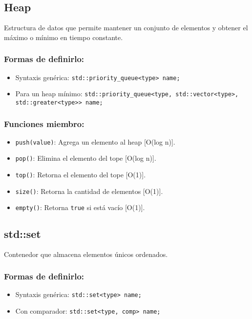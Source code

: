 \subsection{Heap}
\label{subsec:heap}
Estructura de datos que permite mantener un conjunto de elementos y obtener el máximo o mínimo en tiempo constante. 

\subsubsection*{Formas de definirlo:}
\begin{itemize}
  \item Syntaxis genérica: \texttt{std::priority\_queue<type> name;}
  \item Para un heap mínimo: \texttt{std::priority\_queue<type, std::vector<type>, std::greater<type>> name;}
\end{itemize}

\subsubsection*{Funciones miembro:}
\begin{itemize}
  \item \texttt{push(value)}: Agrega un elemento al heap [O(log n)].
  \item \texttt{pop()}: Elimina el elemento del tope [O(log n)].
  \item \texttt{top()}: Retorna el elemento del tope [O(1)].
  \item \texttt{size()}: Retorna la cantidad de elementos [O(1)].
  \item \texttt{empty()}: Retorna \texttt{true} si está vacío [O(1)]. 
\end{itemize}


\subsection{std::set}
\label{subsec:std_set}
Contenedor que almacena elementos únicos ordenados. 

\subsubsection*{Formas de definirlo:}
\begin{itemize}
  \item Syntaxis genérica: \texttt{std::set<type> name;}
  \item Con comparador: \texttt{std::set<type, comp> name;}
\end{itemize}

